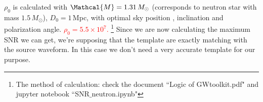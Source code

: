 \documentclass{article}
\begin{document}
$\rho_0$ is calculated with $\Mathcal{M}=1.31\,M_\odot$ (corresponds to neutron star with mass $1.5\,M_\odot$), $D_0=1$\,Mpc, with optimal sky position , inclination and polarization angle. \textcolor{red}{$\rho_0=5.5\times10^7$.} \footnote{The method of calculation: check the document ``Logic of GWtoolkit.pdf" and jupyter notebook ``SNR$\_$neutron.ipynb"} Since we are now calculating the maximum SNR we can get, we're supposing that the template are exactly matching with the source waveform. In this case we don't need a very accurate template for our purpose. 
\end{document}
